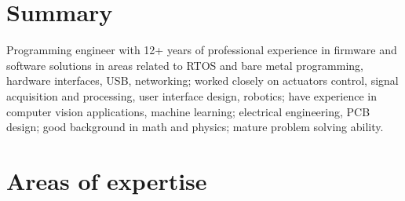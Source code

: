 \vspace*{-15mm}

\section{Summary}


Programming engineer with 12+ years of professional experience in firmware and software solutions in areas related to RTOS and bare metal programming, hardware interfaces, USB, networking; worked closely on actuators control, signal acquisition and processing, user interface design, robotics; have experience in computer vision applications, machine learning; electrical engineering, PCB design; good background in math and physics; mature problem solving ability.

\vspace*{-4mm}
\section{Areas of expertise}

